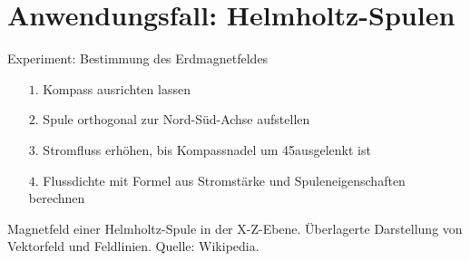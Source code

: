 \part{Anwendungsfall: Helmholtz-Spulen}
\label{part:physics}
\begin{frame}[fragile]{Experiment: Bestimmung des Erdmagnetfeldes}
\begin{minipage}{0.5\textwidth}
	{
\begin{itemize}[itemsep=1mm]
	\item[$1.$] Kompass ausrichten lassen
	\item[$2.$] Spule orthogonal zur Nord-Süd-Achse aufstellen
	\item[$3.$] Stromfluss erhöhen, bis Kompassnadel um 45\degree ausgelenkt ist
	\item[$4.$] Flussdichte mit Formel aus Stromstärke und Spuleneigenschaften berechnen
\end{itemize}
}
\end{minipage}
\begin{minipage}{0.48\textwidth}
	\centering
	\tiny Magnetfeld einer Helmholtz-Spule in der X-Z-Ebene. Überlagerte Darstellung von Vektorfeld und Feldlinien. Quelle: Wikipedia.
\end{minipage}
\end{frame}
